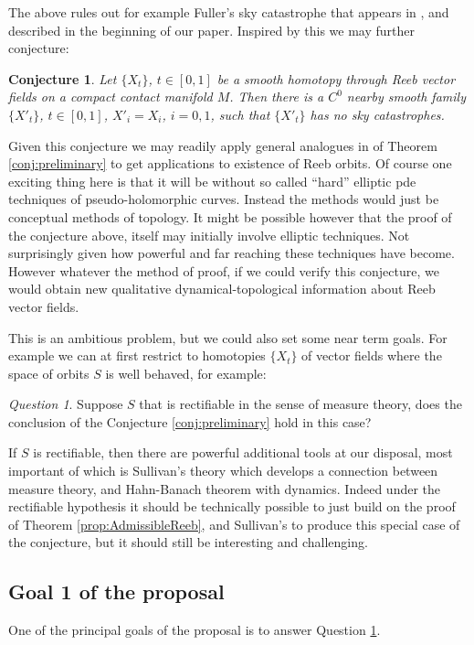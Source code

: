 \documentclass{amsart}
\numberwithin{equation}{section}
\newtheorem{conjecture}{Conjecture}
\theoremstyle{definition}
\theoremstyle{remark}
\newtheorem{question}{Question}
\begin{document}
The above rules out for example Fuller's sky catastrophe that appears in
\cite{citeFullerBlueSky}, and described in the beginning of our paper. Inspired by this we may further conjecture:
\begin{conjecture} Let $\{X _{t} \}$, $t \in [0,1]$ be a smooth homotopy through Reeb
vector fields on a compact contact manifold $M$. Then there is a $C ^{0} $ nearby smooth family $\{X' _{t} \}$, $t \in [0,1]$, $X' _{i}=X _{i}  $, $i=0,1$, such that $\{X' _{t} \}$ has no sky catastrophes.
\end{conjecture}
Given this conjecture we may readily apply general analogues in \cite{citeSavelyevFuller} of Theorem \ref{conj:preliminary} to get applications to existence of Reeb orbits.
Of course one exciting thing here is that it will be without so called ``hard'' elliptic pde techniques of pseudo-holomorphic curves. Instead the methods would just be conceptual methods of topology. It might be possible however that the proof of the conjecture above, itself may initially involve elliptic techniques. Not surprisingly given how powerful and far reaching these techniques have become.
However whatever the method of proof, if we could verify this conjecture,  we would obtain new qualitative dynamical-topological information about Reeb vector fields.  

This is an ambitious problem, but we could also set some near term goals. For example we can at first restrict to homotopies $\{X _{t} \}$ of vector fields where the space of orbits $S$ is well behaved, for example:
\begin{question} \label{quest:rect} Suppose $S$ that is rectifiable in the sense of measure theory, does the conclusion of the Conjecture \ref{conj:preliminary} hold in this case?
   \end{question}
If $S$ is rectifiable, then there are powerful additional tools at our disposal,  most important of which is Sullivan's theory \cite{citeSullivanCycles} which develops a connection between measure theory, and Hahn-Banach theorem with dynamics. Indeed under the rectifiable hypothesis it should be technically possible to just build on the proof of Theorem \ref{prop:AdmissibleReeb}, and Sullivan's \cite{citeSullivanCycles} to produce this special case of the conjecture, but it should still be interesting and challenging.

\subsection {Goal 1 of the proposal} One of the principal goals of the proposal is to answer Question \ref{quest:rect}. 
\end{document}
